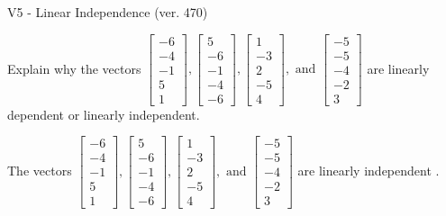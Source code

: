 \begin{exercise}
  \begin{exerciseTitle}V5 - Linear Independence (ver. 470)\end{exerciseTitle}
  \begin{exerciseStatement}
    Explain why the vectors \(\left[\begin{array}{r}
-6 \\
-4 \\
-1 \\
5 \\
1
\end{array}\right] , \left[\begin{array}{r}
5 \\
-6 \\
-1 \\
-4 \\
-6
\end{array}\right] , \left[\begin{array}{r}
1 \\
-3 \\
2 \\
-5 \\
4
\end{array}\right] , \text{ and } \left[\begin{array}{r}
-5 \\
-5 \\
-4 \\
-2 \\
3
\end{array}\right]\) are linearly dependent or linearly independent.	


  \end{exerciseStatement}
  \begin{exerciseAnswer}
   The vectors \(\left[\begin{array}{r}
-6 \\
-4 \\
-1 \\
5 \\
1
\end{array}\right] , \left[\begin{array}{r}
5 \\
-6 \\
-1 \\
-4 \\
-6
\end{array}\right] , \left[\begin{array}{r}
1 \\
-3 \\
2 \\
-5 \\
4
\end{array}\right] , \text{ and } \left[\begin{array}{r}
-5 \\
-5 \\
-4 \\
-2 \\
3
\end{array}\right]\) are 
  	 linearly independent  .
  


  \end{exerciseAnswer}
\end{exercise}